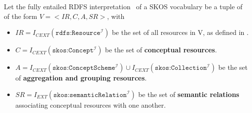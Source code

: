 \begin{definition} Let the fully entailed RDFS interpretation~\cite{RDFSEM2012} of a SKOS vocabulary be a tuple of of the form $V = <IR, C, A, SR>$, with
    

\begin{itemize}
	\item \(IR = I_{CEXT}(\texttt{rdfs:Resource}^\mathcal{I})\) be the set of all resources in V, as defined in \cite{RDFSEM2012}.

	\item \(C = I_{CEXT}(\texttt{skos:Concept}^\mathcal{I})\) be the set of \textbf{conceptual resources}.

  \item \(A = I_{CEXT}(\texttt{skos:ConceptScheme}^\mathcal{I}) \cup I_{CEXT}(\texttt{skos:Collection}^\mathcal{I})\) be the set of \textbf{aggregation and grouping resources}.


	\item \(SR = I_{EXT}(\texttt{skos:semanticRelation}^\mathcal{I})\) be the set of \textbf{semantic relations} associating conceptual resources with one another.

\end{itemize}

\end{definition}




